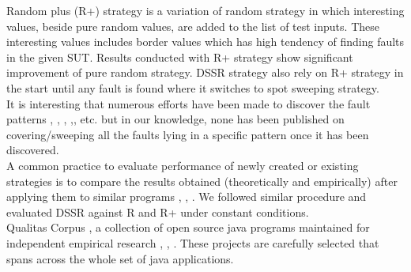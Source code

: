 \documentclass[conference]{IEEEtran}
\begin{document}
Random plus (R+) strategy \cite{Leitner2007} is a variation of random strategy in which interesting values, beside pure random values, are added to the list of test inputs. These interesting values includes border values \cite{Beizer1990} which has high tendency of finding faults in the given SUT. Results conducted with R+ strategy show significant improvement of pure random strategy. DSSR strategy also rely on R+ strategy in the start until any fault is found where it switches to spot sweeping strategy. \\

It is interesting that numerous efforts have been made to discover the fault patterns \cite{Chen2010}, \cite{Chen2005}, \cite{Chan2002}, \cite{Chen2004a},\cite{Chen2003}, etc. but in our knowledge, none has been published on covering/sweeping all the faults lying in a specific pattern once it has been discovered.\\

A common practice to evaluate performance of newly created or existing strategies is to compare the results obtained (theoretically and empirically) after applying them to similar programs \cite{Gutjahr1999}, \cite{Duran1984}, \cite{Hamlet1990}. We followed similar procedure and evaluated DSSR against R and R+ under constant conditions. \\

Qualitas Corpus \cite{Tempero2010}, a collection of open source java programs maintained for independent empirical research \cite{Oriol2012}, \cite{Tempero2010a}, \cite{Tempero2008}. These projects are carefully selected that spans across the whole set of java applications.

\end{document}
